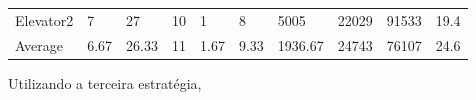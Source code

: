 ﻿\documentclass[a4paper]{article}
\begin{document}
\begin{table}[h]
\begin{tabular}{@{}llllllllll@{}}
Elevator2 & 7        & 27            & 10           & 1                                                               & 8                                                                  & 5005                                                         & 22029                                                 & 91533                                                   & 19.4         \\
Average   & 6.67     & 26.33         & 11        & 1.67                                                            & 9.33                                                               & 1936.67                                                         & 24743                                                 & 76107                                                   &  24.6         \\ \bottomrule
\end{tabular}
\end{table}

\newpage

Utilizando a terceira estratégia,
\end{document}
